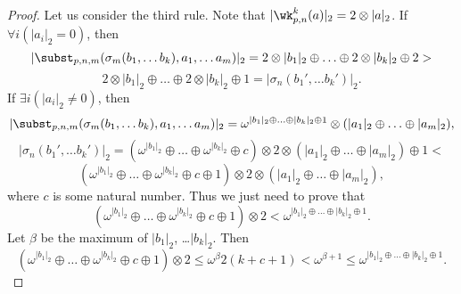 \begin{proof}
Let us consider the third rule.
Note that $|\wk^k_{p,n}(a)|_2 = 2 \otimes |a|_2$.
If $\forall i (|a_i|_2 = 0)$, then
\[ |\subst_{p,n,m}(\sigma_m(b_1, \ldots b_k), a_1, \ldots a_m)|_2 = 2 \otimes |b_1|_2 \oplus \ldots \oplus 2 \otimes |b_k|_2 \oplus 2 > \]
\[ 2 \otimes |b_1|_2 \oplus \ldots \oplus 2 \otimes |b_k|_2 \oplus 1 = |\sigma_n(b_1', \ldots b_k')|_2. \]
If $\exists i (|a_i|_2 \neq 0)$, then 
\[ |\subst_{p,n,m}(\sigma_m(b_1, \ldots b_k), a_1, \ldots a_m)|_2 = \omega^{|b_1|_2 \oplus \ldots \oplus |b_k|_2 \oplus 1} \otimes (|a_1|_2 \oplus \ldots \oplus |a_m|_2), \]
\[ |\sigma_n(b_1', \ldots b_k')|_2 = (\omega^{|b_1|_2} \oplus \ldots \oplus \omega^{|b_k|_2} \oplus c) \otimes 2 \otimes (|a_1|_2 \oplus \ldots \oplus |a_m|_2) \oplus 1 < \]
\[ (\omega^{|b_1|_2} \oplus \ldots \oplus \omega^{|b_k|_2} \oplus c \oplus 1) \otimes 2 \otimes (|a_1|_2 \oplus \ldots \oplus |a_m|_2), \]
where $c$ is some natural number.
Thus we just need to prove that
\[ (\omega^{|b_1|_2} \oplus \ldots \oplus \omega^{|b_k|_2} \oplus c \oplus 1) \otimes 2 < \omega^{|b_1|_2 \oplus \ldots \oplus |b_k|_2 \oplus 1}. \]
Let $\beta$ be the maximum of $|b_1|_2$, \ldots $|b_k|_2$.
Then
\[ (\omega^{|b_1|_2} \oplus \ldots \oplus \omega^{|b_k|_2} \oplus c \oplus 1) \otimes 2 \leq \omega^\beta 2 (k + c + 1) < \omega^{\beta + 1} \leq \omega^{|b_1|_2 \oplus \ldots \oplus |b_k|_2 \oplus 1}. \]


\end{proof}
